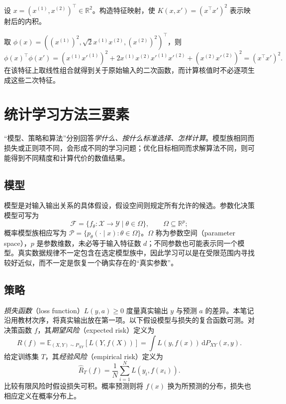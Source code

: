\begin{example}
\label{ex:lh-quadratic-kernel}
设 $x=(x^{(1)},x^{(2)})^\top\in\mathbb R^2$。构造特征映射，使 $K(x,x')=(x^\top x')^2$ 表示映射后的内积。
\end{example}
\begin{solve}
取 $\phi(x)=((x^{(1)})^2,\sqrt2x^{(1)}x^{(2)},(x^{(2)})^2)^\top$，则
\[
    \phi(x)^\top\phi(x')
    =(x^{(1)}x'^{(1)})^2
      +2x^{(1)}x^{(2)}x'^{(1)}x'^{(2)}
      +(x^{(2)}x'^{(2)})^2
    =(x^\top x')^2.
\]
在该特征上取线性组合就得到关于原始输入的二次函数，而计算核值时不必逐项生成这些二次特征。
\end{solve}

\section{统计学习方法三要素}
\label{sec:lh-three-elements}

“模型、策略和算法”分别回答\emph{学什么、按什么标准选择、怎样计算}。模型族相同而损失或正则项不同，会形成不同的学习问题；优化目标相同而求解算法不同，则可能得到不同精度和计算代价的数值结果。

\subsection{模型}
\label{subsec:lh-model}

模型是对输入输出关系的具体假设，假设空间则规定所有允许的候选。参数化决策模型可写为
\[
    \mathcal F=\{f_\theta:\mathcal X\to\mathcal Y\mid\theta\in\Omega\},
    \qquad \Omega\subseteq\mathbb R^p;
\]
概率模型族相应写为 $\mathcal P=\{p_\theta(\cdot\mid x):\theta\in\Omega\}$。$\Omega$ 称为参数空间（parameter space），$p$ 是参数维数，未必等于输入特征数 $d$；不同参数也可能表示同一个模型。真实数据规律不一定包含在选定模型族中，因此学习可以是在受限范围内寻找较好近似，而不一定是恢复一个确实存在的“真实参数”。

\subsection{策略}
\label{subsec:lh-strategy}

\begin{definition}
\label{def:lh-loss-risk}
\emph{损失函数}（loss function）$L(y,a)\geq0$ 度量真实输出 $y$ 与预测 $a$ 的差异。本笔记沿用教材次序，将真实输出放在第一项。以下假设模型与损失的复合函数可测。对决策函数 $f$，其\emph{期望风险}（expected risk）定义为
\begin{equation}
    R(f)=\mathbb E_{(X,Y)\sim P_{XY}}[L(Y,f(X))]
        =\int L(y,f(x))\,\mathrm dP_{XY}(x,y).
    \label{eq:lh-expected-risk}
\end{equation}
给定训练集 $T$，其\emph{经验风险}（empirical risk）定义为
\begin{equation}
    \widehat R_T(f)=\frac1N\sum_{i=1}^N L(y_i,f(x_i)).
    \label{eq:lh-empirical-risk}
\end{equation}
比较有限风险时假设损失可积。概率预测则将 $f(x)$ 换为所预测的分布，损失也相应定义在概率分布上。
\end{definition}

